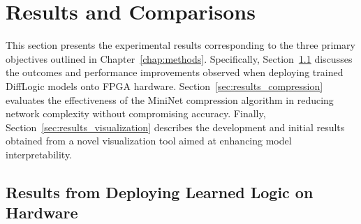 \chapter{Results and Comparisons}
\label{chap:results}


This section presents the experimental results corresponding to the three primary objectives outlined in Chapter~\ref{chap:methods}. Specifically, Section~\ref{sec:results_fpga} discusses the outcomes and performance improvements observed when deploying trained DiffLogic models onto FPGA hardware. Section~\ref{sec:results_compression} evaluates the effectiveness of the MiniNet compression algorithm in reducing network complexity without compromising accuracy. Finally, Section~\ref{sec:results_visualization} describes the development and initial results obtained from a novel visualization tool aimed at enhancing model interpretability.

\section{Results from Deploying Learned Logic on Hardware}
\label{sec:results_fpga}





